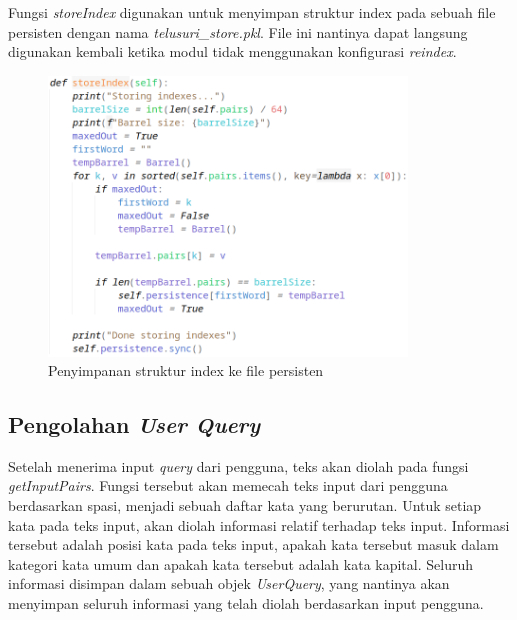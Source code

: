 Fungsi \textit{storeIndex} digunakan untuk menyimpan struktur index pada sebuah
file persisten dengan nama \textit{telusuri\_store.pkl}. File ini nantinya dapat 
langsung digunakan kembali ketika modul tidak menggunakan konfigurasi
\textit{reindex}.

\begin{figure}[H]
  \centering{}
	\includegraphics[width=0.85\textwidth]{gambar/implementasi_storeindex}
  \caption{Penyimpanan struktur index ke file persisten}
\end{figure}

\subsection{Pengolahan \textit{User Query}}

Setelah menerima input \textit{query} dari pengguna, teks akan diolah pada 
fungsi \textit{getInputPairs}. Fungsi tersebut akan memecah teks input dari 
pengguna berdasarkan spasi, menjadi sebuah daftar kata yang berurutan. Untuk 
setiap kata pada teks input, akan diolah informasi relatif terhadap teks input.
Informasi tersebut adalah posisi kata pada teks input, apakah kata tersebut 
masuk dalam kategori kata umum dan apakah kata tersebut adalah kata kapital.
Seluruh informasi disimpan dalam sebuah objek \textit{UserQuery}, yang nantinya 
akan menyimpan seluruh informasi yang telah diolah berdasarkan input pengguna.

